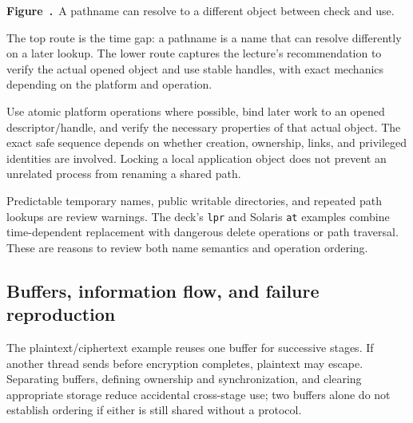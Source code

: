 \documentclass[11pt,a4paper]{article}
\numberwithin{figure}{section}
\newcommand{\diagramcaption}[1]{\par\smallskip\refstepcounter{figure}\begin{center}\small\textbf{Figure~\thefigure.}~#1\end{center}}
\begin{document}
\begin{center}\end{center}
\diagramcaption{A pathname can resolve to a different object between check and use.}
The top route is the time gap: a pathname is a name that can resolve differently on a later lookup. The lower route captures the lecture's recommendation to verify the actual opened object and use stable handles, with exact mechanics depending on the platform and operation.

Use atomic platform operations where possible, bind later work to an opened descriptor/handle, and verify the necessary properties of that actual object. The exact safe sequence depends on whether creation, ownership, links, and privileged identities are involved. Locking a local application object does not prevent an unrelated process from renaming a shared path.

Predictable temporary names, public writable directories, and repeated path lookups are review warnings. The deck's \texttt{lpr} and Solaris \texttt{at} examples combine time-dependent replacement with dangerous delete operations or path traversal. These are reasons to review both name semantics and operation ordering.

\subsection{Buffers, information flow, and failure reproduction}
The plaintext/ciphertext example reuses one buffer for successive stages. If another thread sends before encryption completes, plaintext may escape. Separating buffers, defining ownership and synchronization, and clearing appropriate storage reduce accidental cross-stage use; two buffers alone do not establish ordering if either is still shared without a protocol.
\end{document}
